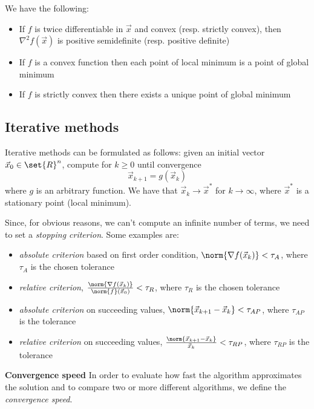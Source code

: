 \begin{proposition}
    We have the following:
    \begin{itemize}
        \item If $f$ is twice differentiable in $\vec{x}$ and convex (resp. strictly convex), then $\nabla^2{f}(\vec{x})$ is positive semidefinite (resp. positive definite)
        \item If $f$ is a convex function then each point of local minimum is a point of global minimum
        \item If $f$ is strictly convex then there exists a unique point of global minimum
    \end{itemize}
\end{proposition}


\subsection{Iterative methods}
Iterative methods can be formulated as follows: given an initial vector $\vec{x}_0 \in \set{R}^n$, compute for $k \geq 0$ until convergence
$$ \vec{x}_{k+1} = g(\vec{x}_k) $$
where $g$ is an arbitrary function. We have that $\vec{x}_k \rightarrow \vec{x}^*$ for $k \rightarrow \infty$, where $\vec{x}^*$ is a stationary point (local minimum).

Since, for obvious reasons, we can't compute an infinite number of terms, we need to set a \textit{stopping criterion}. Some examples are:
\begin{itemize}
    \item \textit{absolute criterion} based on first order condition, $\norm{\nabla{f}(\vec{x}_k)} < \tau_A$, where $\tau_A$ is the chosen tolerance
    \item \textit{relative criterion}, $\frac{\norm{\nabla{f}(\vec{x}_k)}}{\norm{f}(\vec{x}_0)} < \tau_R$, where $\tau_R$ is the chosen tolerance
    \item \textit{absolute criterion} on succeeding values, $\norm{\vec{x}_{k+1} - \vec{x}_k} < \tau_{AP}$, where $\tau_{AP}$ is the tolerance
    \item \textit{relative criterion} on succeeding values, $\frac{\norm{\vec{x}_{k+1} - \vec{x}_k}}{\vec{x}_k} < \tau_{RP}$, where $\tau_{RP}$ is the tolerance
\end{itemize}

\textbf{Convergence speed}
In order to evaluate how fast the algorithm approximates the solution and to compare two or more different algorithms, we define the \textit{convergence speed}.

